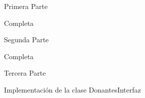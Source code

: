 Primera Parte
\begin{DoxyItemize}
\item Completa
\end{DoxyItemize}

Segunda Parte
\begin{DoxyItemize}
\item Completa
\end{DoxyItemize}

Tercera Parte
\begin{DoxyItemize}
\item Implementación de la clase Donantes\+Interfaz
\item 
\end{DoxyItemize}